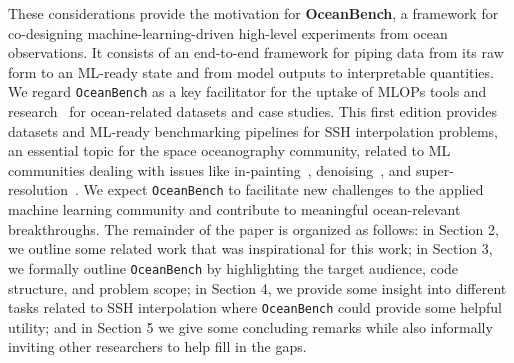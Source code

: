 
These considerations provide the motivation for \textbf{OceanBench}, a framework for co-designing machine-learning-driven high-level experiments from ocean observations. 
It consists of an end-to-end framework for piping data from its raw form to an ML-ready state and from model outputs to interpretable quantities. 
We regard \texttt{OceanBench} as a key facilitator for the uptake of MLOPs tools and research~\cite{MLOPS1,MLOPS2} for ocean-related datasets and case studies. This first edition provides datasets and ML-ready benchmarking pipelines for SSH interpolation problems, an essential topic for the space oceanography community, related to ML communities dealing with issues like in-painting~\cite{InPaintingSurvey}, denoising~\cite{DENOISESURVEY,DENOISESURVEY2}, and super-resolution~\cite{SuperResSurvey}. 
We expect \texttt{OceanBench} to facilitate new challenges to the applied machine learning community and contribute to meaningful ocean-relevant breakthroughs.
%
The remainder of the paper is organized as follows: in Section 2, we outline some related work that was inspirational for this work; in  Section 3, we formally outline \texttt{OceanBench} by highlighting the target audience, code structure, and problem scope; in Section 4, we provide some insight into different tasks related to SSH interpolation where \texttt{OceanBench} could provide some helpful utility; and in Section 5 we give some concluding remarks while also informally inviting other researchers to help fill in the gaps.

